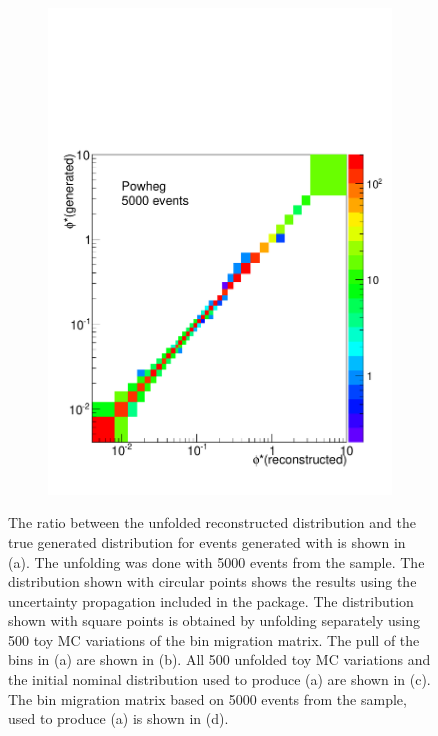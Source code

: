 \begin{figure}[!htbp]
\begin{subfigure}[b]{\SideBySidePlotWidth}
        \includegraphics[width=\textwidth]{figures/BinM_P_5000.pdf}
        \caption{}
        \label{fig:bin_migration_5000}
    \end{subfigure}
    \caption{
        The ratio between the unfolded reconstructed \phistar distribution and
        the true generated \phistar distribution for \Ztoee events generated
        with \MADGRAPH is shown in (a). The unfolding was done with \num{5000}
        events from the \POWHEG sample. The distribution shown with circular
        points shows the results using the uncertainty propagation included in
        the \RooUnfold package. The distribution shown with square points is
        obtained by unfolding separately using 500 toy MC variations of the bin
        migration matrix. The pull of the bins in (a) are shown in (b). All
        \num{500} unfolded toy MC variations and the initial nominal
        distribution used to produce (a) are shown in (c). The bin migration
        matrix based on \num{5000} events from the \POWHEG sample, used to
        produce (a) is shown in (d).
    }
\label{fig:5000_propegation_unfolding}
\end{figure}

